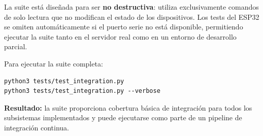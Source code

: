 La suite está diseñada para ser \textbf{no destructiva}: utiliza exclusivamente comandos de solo lectura que no modifican el estado de los dispositivos. Los tests del ESP32 se omiten automáticamente si el puerto serie no está disponible, permitiendo ejecutar la suite tanto en el servidor real como en un entorno de desarrollo parcial.

Para ejecutar la suite completa:

\begin{verbatim}
python3 tests/test_integration.py
python3 tests/test_integration.py --verbose
\end{verbatim}

\textbf{Resultado:} la suite proporciona cobertura básica de integración para todos los subsistemas implementados y puede ejecutarse como parte de un pipeline de integración continua.

%
%
%
%
%
%
%

